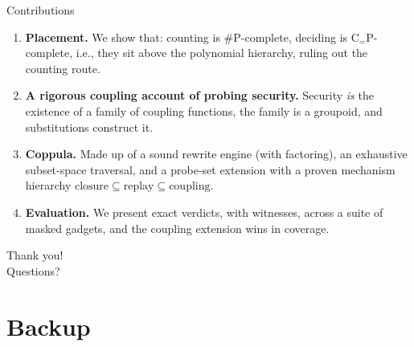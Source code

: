 \documentclass[aspectratio=169,10pt]{beamer}
\newcommand{\toolname}{Coppula}
\newcommand{\CeqP}{\mathrm{C}_{=}\mathrm{P}}
\newcommand{\sharpP}{\#\mathrm{P}}
\begin{document}
\begin{frame}{Contributions}
  \begin{enumerate}
    \item<1-> \textbf{Placement.} We show that: counting is
      $\sharpP$-complete, deciding is $\CeqP$-complete, i.e., they sit above the
      polynomial hierarchy, ruling out the counting route.
    \item<2-> \textbf{A rigorous coupling account of probing security.}
      Security \emph{is} the existence of a family of coupling functions, the
      family is a groupoid, and substitutions construct it.
    \item<3-> \textbf{\toolname.} Made up of a sound rewrite engine (with factoring), an
      exhaustive subset-space traversal,
      and a probe-set extension with a proven mechanism hierarchy
      $\text{closure} \subseteq \text{replay} \subseteq \text{coupling}$.
    \item<4-> \textbf{Evaluation.} We present exact verdicts, with witnesses, across a
      suite of masked gadgets, and the coupling extension wins in coverage.
  \end{enumerate}
\end{frame}

\begin{frame}[standout]
  Thank you!\\[2ex]
  {\normalsize Questions?}
\end{frame}

\appendix
\section*{Backup}
\end{document}

